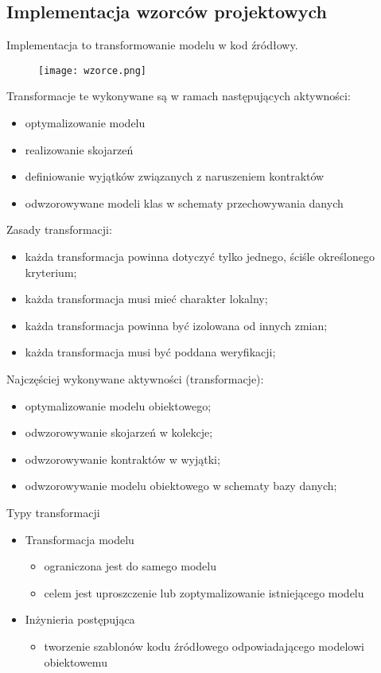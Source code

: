 \documentclass[a4paper]{article}
\begin{document}
\subsection{Implementacja wzorców projektowych}
Implementacja to transformowanie modelu w kod źródłowy.



\begin{figure}[!h]
    \texttt{[image: wzorce.png]}
\end{figure}

Transformacje te wykonywane są w ramach następujących
aktywności:
\begin{itemize}
    \item optymalizowanie modelu
    \item realizowanie skojarzeń
    \item definiowanie wyjątków związanych z naruszeniem kontraktów
    \item odwzorowywane modeli klas w schematy przechowywania danych
\end{itemize}

Zasady transformacji:
\begin{itemize}
    \item każda transformacja powinna dotyczyć tylko jednego,
    ściśle określonego kryterium;
    \item każda transformacja musi mieć charakter lokalny;
    \item każda transformacja powinna być izolowana od
    innych zmian;
    \item każda transformacja musi być poddana weryfikacji;
\end{itemize}


Najczęściej wykonywane aktywności (transformacje):
\begin{itemize}
    \item optymalizowanie modelu obiektowego;
    \item odwzorowywanie skojarzeń w kolekcje;
    \item odwzorowywanie kontraktów w wyjątki;
    \item odwzorowywanie modelu obiektowego w schematy
    bazy danych;
\end{itemize}

Typy transformacji
    \begin{itemize}
        \item Transformacja modelu
        \begin{itemize}
            \item ograniczona jest do samego modelu
            \item celem jest uproszczenie lub zoptymalizowanie istniejącego modelu
        \end{itemize}
        \item Inżynieria postępująca
        \begin{itemize}
            \item tworzenie szablonów kodu źródłowego odpowiadającego modelowi obiektowemu
        \end{itemize}
    \end{itemize}
\end{document}
